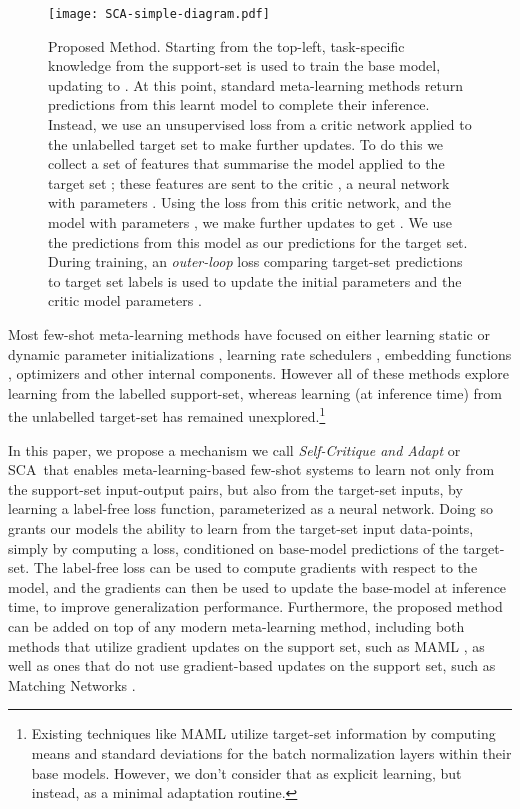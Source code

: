 \documentclass{article} \usepackage[dvipsnames]{xcolor}
\newcommand{\proposedmethod}{SCA}
\begin{document}
\begin{figure}[!htbp]
    \centering
    \texttt{[image: SCA-simple-diagram.pdf]}
    \vspace{-5.0mm}
    \caption{Proposed Method. Starting from the top-left, task-specific knowledge from the support-set is used to train the base model, updating  to . At this point, standard meta-learning methods return predictions from this learnt model to complete their inference. Instead, we use an unsupervised loss from a critic network  applied to the unlabelled target set to make further updates. To do this we collect a set of features  that summarise the model applied to the target set ; these features are sent to the critic , a neural network with parameters . Using the loss from this critic network, and the model with parameters , we make further updates to get . We use the predictions from this model as our predictions for the target set. During training, an \emph{outer-loop} loss comparing target-set predictions to target set labels is used to update the initial parameters  and the critic model parameters .}
    \label{fig:sca-diagram}
    \vspace{-5.0mm}
\end{figure}




Most few-shot meta-learning methods have focused on either learning static \citep{finn2017model,antoniou2018train,li2016learning} or dynamic parameter initializations \citep{rusu2018meta}, learning rate schedulers \citep{antoniou2018train}, embedding functions \cite{vinyals2016matching, snell2017prototypical}, optimizers \cite{ravi2016optimization} and other internal components. However all of these methods explore learning from the labelled support-set, whereas learning (at inference time) from the unlabelled target-set has remained unexplored.\footnote{Existing techniques like MAML \cite{finn2017model} utilize target-set information by computing means and standard deviations for the batch normalization layers within their base models. However, we don't consider that as explicit learning, but instead, as a minimal adaptation routine.}

In this paper, we propose a mechanism we call \emph{Self-Critique and Adapt} or \proposedmethod\ that enables meta-learning-based few-shot systems to learn not only from the support-set input-output pairs, but also from the target-set inputs, by learning a label-free loss function, parameterized as a neural network. Doing so grants our models the ability to learn from the target-set input data-points, simply by computing a loss, conditioned on base-model predictions of the target-set. The label-free loss can be used to compute gradients with respect to the model, and the gradients can then be used to update the base-model at inference time, to improve generalization performance. Furthermore, the proposed method can be added on top of any modern meta-learning method, including both methods that utilize gradient updates on the support set, such as MAML \citep{finn2017model}, as well as ones that do not use gradient-based updates on the support set, such as Matching Networks \citep{vinyals2016matching}.
\end{document}
